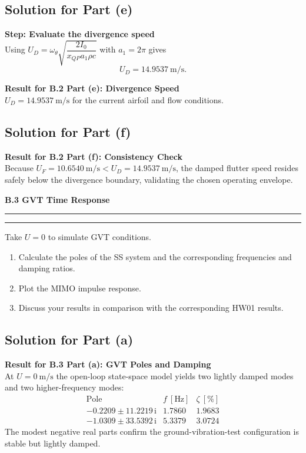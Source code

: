 \documentclass[12pt]{article}
\newcommand{\question}[1]{%
  \clearpage
  \vspace{0.5cm}
  {\noindent\normalsize \textbf{#1}}%
  \vspace{0.2cm}
  \hrule
  \vspace{0.1cm}
  \hrule
  \vspace{0.3cm}
}
\begin{document}
\subsection*{Solution for Part (e)}

\begin{stepbox}
\textbf{Step: Evaluate the divergence speed}\\[0.5em]
Using $U_D = \omega_\theta\sqrt{\dfrac{2 I_0}{x_{QP} a_1 \rho c}}$ with $a_1 = 2\pi$ gives
\[
U_D = 14.9537~\text{m/s}.
\]
\end{stepbox}

\begin{resultsbox}
\textbf{Result for B.2 Part (e): Divergence Speed}\\[0.5em]
$U_D = 14.9537~\text{m/s}$ for the current airfoil and flow conditions.
\end{resultsbox}

\subsection*{Solution for Part (f)}

\begin{resultsbox}
\textbf{Result for B.2 Part (f): Consistency Check}\\[0.5em]
Because $U_F = 10.6540~\text{m/s} < U_D = 14.9537~\text{m/s}$, the damped flutter speed resides safely below the divergence boundary, validating the chosen operating envelope.
\end{resultsbox}

\question{B.3 GVT Time Response}\label{quest:B3}

Take $U = 0$ to simulate GVT conditions.
\begin{enumerate}[label=(\alph*)]
  \item Calculate the poles of the SS system and the corresponding frequencies and damping ratios.
  \item Plot the MIMO impulse response.
  \item Discuss your results in comparison with the corresponding HW01 results.
\end{enumerate}
\subsection*{Solution for Part (a)}

\begin{resultsbox}
\textbf{Result for B.3 Part (a): GVT Poles and Damping}\\[0.5em]
At $U = 0~\text{m/s}$ the open-loop state-space model yields two lightly damped modes and two higher-frequency modes:
\[
\begin{array}{c|c|c}
\text{Pole} & f~[\text{Hz}] & \zeta~[\%] \\
\hline
-0.2209 \pm 11.2219\,\mathrm{i} & 1.7860 & 1.9683 \\
-1.0309 \pm 33.5392\,\mathrm{i} & 5.3379 & 3.0724
\end{array}
\]
The modest negative real parts confirm the ground-vibration-test configuration is stable but lightly damped.
\end{resultsbox}
\end{document}
